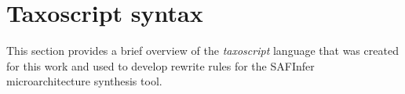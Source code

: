 \chapter{Taxoscript syntax}

This section provides a brief overview of the \textit{taxoscript} language that was created for this work and used to develop rewrite rules for the SAFInfer microarchitecture synthesis tool.

\clearpage
\newpage
